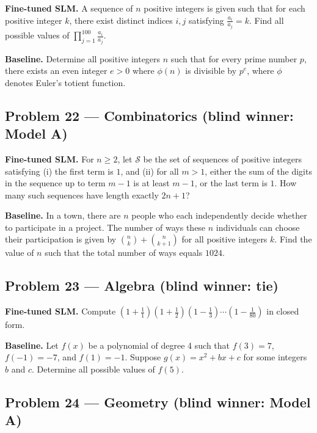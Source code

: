 \documentclass[11pt]{article}
\begin{document}
\textbf{Fine-tuned SLM.} A sequence of $n$ positive integers is given such that for each positive integer $k$, there exist distinct indices $i,j$ satisfying $\frac{a_i}{a_j}=k$. Find all possible values of $\prod_{j=1}^{100}\frac{a_i}{a_j}$.

\medskip

\textbf{Baseline.} Determine all positive integers $n$ such that for every prime number $p$, there exists an even integer $e > 0$ where $\phi(n)$ is divisible by $p^{e}$, where $\phi$ denotes Euler's totient function.

\subsection*{Problem 22 --- Combinatorics \quad (blind winner: Model A)}

\textbf{Fine-tuned SLM.} For $n \geqslant 2$, let $\mathcal{S}$ be the set of sequences of positive integers satisfying (i) the first term is $1$, and (ii) for all $m > 1$, either the sum of the digits in the sequence up to term $m-1$ is at least $m - 1$, or the last term is $1$. How many such sequences have length exactly $2n+1$?

\medskip

\textbf{Baseline.} In a town, there are $n$ people who each independently decide whether to participate in a project. The number of ways these $n$ individuals can choose their participation is given by $\binom{n}{k} + \binom{n}{k+1}$ for all positive integers $k$. Find the value of $n$ such that the total number of ways equals $1024$.

\subsection*{Problem 23 --- Algebra \quad (blind winner: tie)}

\textbf{Fine-tuned SLM.} Compute $(1+\frac{1}{1})(1+\frac{1}{2})(1-\frac{1}{3})\cdots(1-\frac{1}{80})$ in closed form.

\medskip

\textbf{Baseline.} Let $f(x)$ be a polynomial of degree 4 such that $f(3) = 7$, $f(-1) = -7$, and $f(1) = -1$. Suppose $g(x) = x^2 + bx + c$ for some integers $b$ and $c$. Determine all possible values of $f(5)$.

\subsection*{Problem 24 --- Geometry \quad (blind winner: Model A)}
\end{document}
